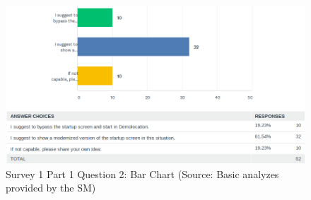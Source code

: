\documentclass[a4paper,10pt,twoside]{article}
\begin{document}
\vspace{0.3cm}
\begin{figure}[hbt!] 
\begin{center}
\includegraphics[width=17cm]{../surveys/analyzed_data/survey1_part1_question2_histogram_sm.png} 
\caption[Survey 1 Part 1 Question 2: Bar Chart]{Survey 1 Part 1 Question 2: Bar Chart (Source: Basic analyzes provided by the SM)}
\label{fig:survey1_part1_question2_histogram_sm}
\end{center}
\end{figure}
\end{document}

